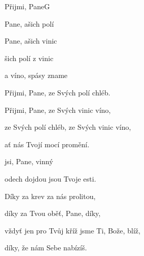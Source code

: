 \begin{song}{Přijmi, Pane}{G}{}

\begin{SBVerse}

 Pane, ašich polí  

 Pane, ašich vinic 

šich polí  z  vinic 

 a víno, spásy zname

\end{SBVerse}

\begin{SBVerse}

Přijmi, Pane, ze Svých polí chléb. 

Přijmi, Pane, ze Svých vinic víno, 

ze Svých polí chléb, ze Svých vinic víno, 

ať nás Tvojí mocí promění.

\end{SBVerse}

\begin{SBChorus}

 jsi, Pane,   vinný  

odech dojdou   jsou Tvoje esti.

\end{SBChorus}

\begin{SBVerse}

Díky za krev za nás prolitou, 

díky za Tvou oběť, Pane, díky,

vždyť jen pro Tvůj kříž jsme Ti, Bože, blíž,

díky, že nám Sebe nabízíš.

\end{SBVerse}

\end{song}

\pagebreak